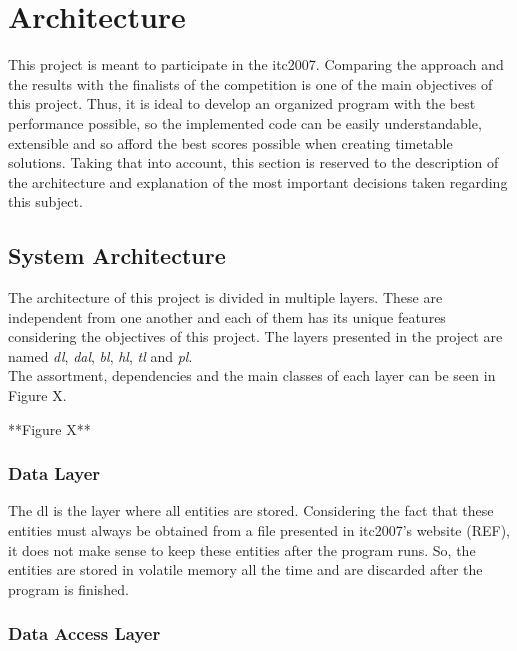 \chapter{Architecture}
\label{Architecture}
\thispagestyle{plain}

This project is meant to participate in the \gls{itc2007}. Comparing the approach and the results with the finalists of the competition is one of the main objectives of this project. Thus, it is ideal to develop an organized program with the best performance possible, so the implemented code can be easily understandable, extensible and so afford the best scores possible when creating timetable solutions. Taking that into account, this section is reserved to the description of the architecture and explanation of the most important decisions taken regarding this subject.

\section{System Architecture}

The architecture of this project is divided in multiple layers. These are independent from one another and each of them has its unique features considering the objectives of this project. The layers presented in the project are named \textit{\gls{dl}}, \textit{\gls{dal}}, \textit{\gls{bl}}, \textit{\gls{hl}}, \textit{\gls{tl}} and \textit{\gls{pl}}. \\

The assortment, dependencies and the main classes of each layer can be seen in {\color{red}Figure X}.

{\color{red}**Figure X**}

\subsection{Data Layer}

The \gls{dl} is the layer where all entities are stored. Considering the fact that these entities must always be obtained from a file presented in \gls{itc2007}'s website {\color{red}(REF)}, it does not make sense to keep these entities after the program runs. So, the entities are stored in volatile memory all the time and are discarded after the program is finished.

\subsection{Data Access Layer}

